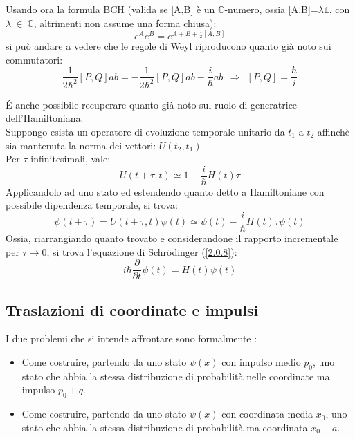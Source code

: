 \documentclass[twoside]{article}
\begin{document}
Usando ora la formula BCH (valida se [A,B] è un $\mathds{C}$-numero, ossia [A,B]=$\lambda \mathds{1}$, con $\lambda \ \in \ \mathds{C}$, altrimenti non assume una forma chiusa):
\begin{equation}
    e^A e^B = e^{A+B+\frac{1}{2}[A,B]}
\end{equation}
si può andare a vedere che le regole di Weyl riproducono quanto già noto sui commutatori:
\begin{equation}
    \frac{1}{2\hbar^2}[P,Q]ab=-\frac{1}{2\hbar^2}[P,Q]ab-\frac{i}{\hbar}ab \ \ \Rightarrow \ \ [P,Q]=\frac{\hbar}{i}
\end{equation} 

\'E anche possibile recuperare quanto già noto sul ruolo di generatrice dell'Hamiltoniana.
\\
Suppongo esista un operatore di evoluzione temporale unitario da $t_1$ a $t_2$ affinchè sia mantenuta la norma dei vettori: $U(t_2,t_1)$.
\\
Per $\tau$ infinitesimali, vale:
\begin{equation}
    U(t+\tau,t)\simeq 1 -\frac{i}{\hbar}H(t)\tau
\end{equation}
Applicandolo ad uno stato ed estendendo quanto detto a Hamiltoniane con possibile dipendenza temporale, si trova:
\begin{equation}
    \psi(t+\tau)=U(t+\tau,t)\psi(t) \simeq \psi(t) - \frac{i}{\hbar}H(t)\tau\psi(t)
\end{equation}
Ossia, riarrangiando quanto trovato e considerandone il rapporto incrementale per $\tau \rightarrow 0$, si trova l'equazione di Schr\"odinger (\ref{2.0.8}):
\begin{equation}
    i\hbar\frac{\partial}{\partial t}\psi(t)=H(t)\psi(t)
\end{equation}

\vspace{0.5cm}

\subsection{Traslazioni di coordinate e impulsi}
I due problemi che si intende affrontare sono formalmente :
\begin{itemize}
    \item Come costruire, partendo da uno stato $\psi(x)$ con impulso medio $p_0$, uno stato che abbia la stessa distribuzione di probabilità nelle coordinate ma impulso $p_0 + q$.
    \item Come costruire, partendo da uno stato $\psi(x)$ con coordinata media $x_0$, uno stato che abbia la stessa distribuzione di probabilità ma coordinata $x_0 - a$.
\end{itemize}
\end{document}
